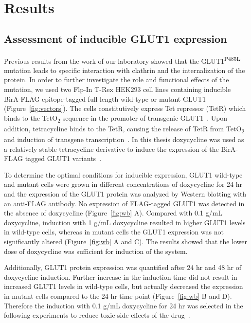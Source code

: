 
\chapter{Results} %
\label{Chapter3} %
\section{Assessment of inducible GLUT1 expression}
Previous results from the work of our laboratory showed that the GLUT1\textsuperscript{P485L} mutation leads to specific interaction with clathrin and the internalization of the protein. In order to further investigate the role and functional effects of the mutation, we used two Flp-In T-Rex HEK293 cell lines containing inducible BirA-FLAG epitope-tagged full length wild-type or mutant GLUT1 (Figure~\ref{fig:vectors}). The cells constitutively express Tet repressor (TetR) which binds to the TetO\textsubscript{2} sequence in the promoter of transgenic GLUT1~\cite{Hillen}. Upon addition, tetracycline binds to the TetR, causing the release of TetR from TetO\textsubscript{2} and induction of transgene transcription~\cite{Hillen}. In this thesis doxycycline was used as a relatively stable tetracycline derivative to induce the expression of the BirA-FLAG tagged GLUT1 variants~\cite{Xu}.

To determine the optimal conditions for inducible expression, GLUT1 wild-type and mutant cells were grown in different concentrations of doxycycline for 24 hr and the expression of the GLUT1 protein was analyzed by Western blotting with an anti-FLAG antibody. No expression of FLAG-tagged GLUT1 was detected in the absence of doxycycline (Figure~\ref{fig:wb} A). Compared with 0.1 \textmu g/mL doxycycline, induction with 1 \textmu g/mL doxycycline resulted in higher GLUT1 levels in wild-type cells, whereas in mutant cells the GLUT1 expression was not significantly altered (Figure~\ref{fig:wb} A and C). The results showed that the lower dose of doxycycline was sufficient for induction of the system. 

Additionally, GLUT1 protein expression was quantified after 24 hr and 48 hr of doxycycline induction. Further increase in the induction time did not result in increased GLUT1 levels in wild-type cells, but actually decreased the expression in mutant cells compared to the 24 hr time point (Figure~\ref{fig:wb} B and D). Therefore the induction with 0.1 \textmu g/mL doxycycline for 24 hr was selected in the following experiments to reduce toxic side effects of the drug~\cite{Zeltser}.

